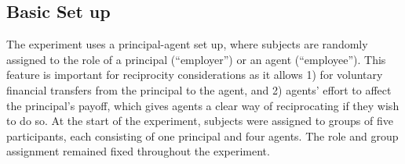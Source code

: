 \subsection{Basic Set up \label{sec:groups}}
The experiment uses a principal-agent set up, where subjects are randomly 
assigned to the role of a principal (``employer'') or an agent (``employee'').
This feature is important for reciprocity considerations as it allows
1) for voluntary financial transfers from the principal to the agent, and 
2) agents' effort to affect the principal's payoff, which gives agents a clear way of reciprocating if they wish to do so. 
At the start of the experiment, subjects were assigned to 
groups of five participants, each consisting of one principal 
and four agents. The role and group assignment remained fixed 
throughout the experiment. 

